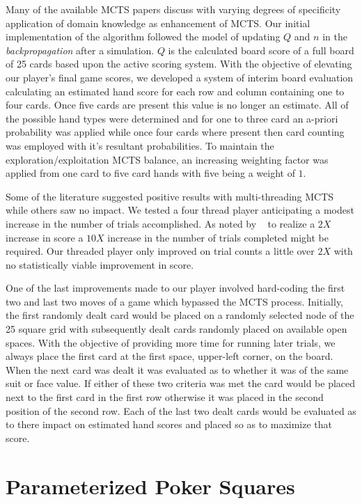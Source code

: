 \documentclass[letterpaper]{article}
\begin{document}
Many of the available MCTS papers discuss with varying degrees of specificity application of domain knowledge as enhancement of MCTS. Our initial implementation of the algorithm followed the model of updating $Q$ and $n$ in the \emph{backpropagation} after a simulation. $Q$ is the calculated board score of a full board of 25 cards based upon the active scoring system. With the objective of elevating our player's final game scores, we developed a system of interim board evaluation calculating an estimated hand score for each row and column containing one to four cards. Once five cards are present this value is no longer an estimate. All of the possible hand types were determined and for one to three card an a-priori probability was applied while once four cards where present then card counting was employed with it's resultant probabilities. To maintain the exploration/exploitation MCTS balance, an increasing weighting factor was applied from one card to five card hands with five being a weight of $1$.

Some of the literature suggested positive results with multi-threading MCTS while others saw no impact. We tested a four thread player anticipating a modest increase in the number of trials accomplished. As noted by ~\cite{browne2010monte} to realize a $2X$ increase in score a $10X$ increase in the number of trials completed might be required. Our threaded player only improved on trial counts a little over $2X$ with no statistically viable improvement in score.

One of the last improvements made to our player involved hard-coding the first two and last two moves of a game which bypassed the MCTS process. Initially, the first randomly dealt card would be placed on a randomly selected node of the 25 square grid with subsequently dealt cards randomly placed on available open spaces. With the objective of providing more time for running later trials, we always place the first card at the first space, upper-left corner, on the board. When the next card was dealt it was evaluated as to whether it was of the same suit or face value. If either of these two criteria was met the card would be placed next to the first card in the first row otherwise it was placed in the second position of the second row. Each of the last two dealt cards would be evaluated as to there impact on estimated hand scores and placed so as to maximize that score.

\section{Parameterized Poker Squares}
\end{document}
